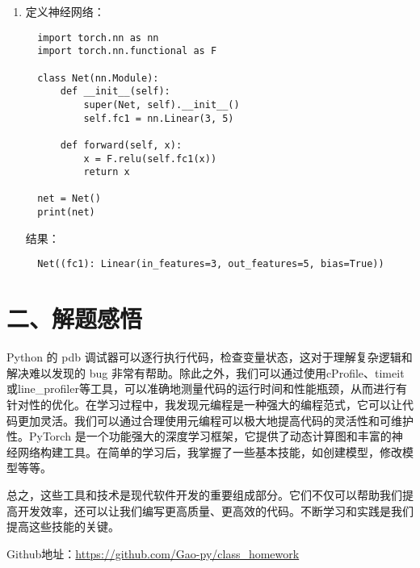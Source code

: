 \documentclass[UTF8]{ctexart}
\begin{document}
\begin{enumerate}
  \item 定义神经网络：
  \begin{verbatim}
  import torch.nn as nn
  import torch.nn.functional as F

  class Net(nn.Module):
      def __init__(self):
          super(Net, self).__init__()
          self.fc1 = nn.Linear(3, 5)

      def forward(self, x):
          x = F.relu(self.fc1(x))
          return x

  net = Net()
  print(net)
  \end{verbatim}
  结果：
  \begin{verbatim}
  Net((fc1): Linear(in_features=3, out_features=5, bias=True))
  \end{verbatim}
\end{enumerate}


\section*{二、解题感悟}
Python 的 pdb 调试器可以逐行执行代码，检查变量状态，这对于理解复杂逻辑和解决难以发现的 bug 非常有帮助。除此之外，我们可以通过使用cProfile、timeit或line\_profiler等工具，可以准确地测量代码的运行时间和性能瓶颈，从而进行有针对性的优化。在学习过程中，我发现元编程是一种强大的编程范式，它可以让代码更加灵活。我们可以通过合理使用元编程可以极大地提高代码的灵活性和可维护性。PyTorch 是一个功能强大的深度学习框架，它提供了动态计算图和丰富的神经网络构建工具。在简单的学习后，我掌握了一些基本技能，如创建模型，修改模型等等。

总之，这些工具和技术是现代软件开发的重要组成部分。它们不仅可以帮助我们提高开发效率，还可以让我们编写更高质量、更高效的代码。不断学习和实践是我们提高这些技能的关键。

Github地址：\url{https://github.com/Gao-py/class_homework}
\end{document}
